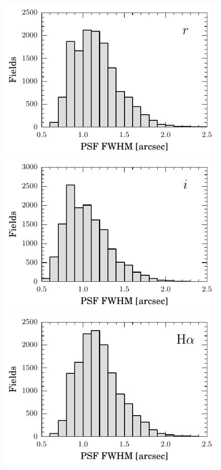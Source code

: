\documentclass[a4paper,useAMS,usenatbib]{mn2e}
\begin{document}
\begin{figure}
    \begin{minipage}[b]{\linewidth}
        \includegraphics[width=\textwidth]{figures/seeing/seeing_r.pdf} 
    \end{minipage}
    \begin{minipage}[b]{\linewidth}
        \includegraphics[width=\textwidth]{figures/seeing/seeing_i.pdf} 
    \end{minipage}
    \begin{minipage}[b]{\linewidth}
        \includegraphics[width=\textwidth]{figures/seeing/seeing_ha.pdf} 

\end{minipage}
\end{figure}
\end{document}
